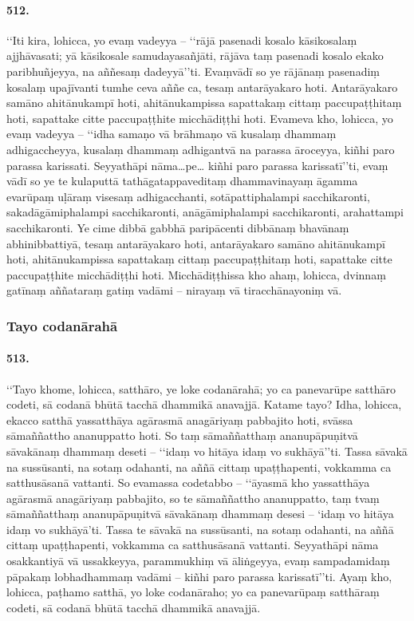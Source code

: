 \paragraph{512.} ‘‘Iti kira, lohicca, yo evaṃ vadeyya – ‘‘rājā pasenadi kosalo kāsikosalaṃ ajjhāvasati; yā kāsikosale samudayasañjāti, rājāva taṃ pasenadi kosalo ekako paribhuñjeyya, na aññesaṃ dadeyyā’’ti. Evaṃvādī so ye rājānaṃ pasenadiṃ kosalaṃ upajīvanti tumhe ceva aññe ca, tesaṃ antarāyakaro hoti. Antarāyakaro samāno ahitānukampī hoti, ahitānukampissa sapattakaṃ cittaṃ paccupaṭṭhitaṃ hoti, sapattake citte paccupaṭṭhite micchādiṭṭhi hoti. Evameva kho, lohicca, yo evaṃ vadeyya – ‘‘idha samaṇo vā brāhmaṇo vā kusalaṃ dhammaṃ adhigaccheyya, kusalaṃ dhammaṃ adhigantvā na parassa āroceyya, kiñhi paro parassa karissati. Seyyathāpi nāma…pe… kiñhi paro parassa karissatī’’ti, evaṃ vādī so ye te kulaputtā tathāgatappaveditaṃ dhammavinayaṃ āgamma evarūpaṃ uḷāraṃ visesaṃ adhigacchanti, sotāpattiphalampi sacchikaronti, sakadāgāmiphalampi sacchikaronti, anāgāmiphalampi sacchikaronti, arahattampi sacchikaronti. Ye cime dibbā gabbhā paripācenti dibbānaṃ bhavānaṃ abhinibbattiyā, tesaṃ antarāyakaro hoti, antarāyakaro samāno ahitānukampī hoti, ahitānukampissa sapattakaṃ cittaṃ paccupaṭṭhitaṃ hoti, sapattake citte paccupaṭṭhite micchādiṭṭhi hoti. Micchādiṭṭhissa kho ahaṃ, lohicca, dvinnaṃ gatīnaṃ aññataraṃ gatiṃ vadāmi – nirayaṃ vā tiracchānayoniṃ vā.

\subsubsection{Tayo codanārahā}

\paragraph{513.} ‘‘Tayo khome, lohicca, satthāro, ye loke codanārahā; yo ca panevarūpe satthāro codeti, sā codanā bhūtā tacchā dhammikā anavajjā. Katame tayo? Idha, lohicca, ekacco satthā yassatthāya agārasmā anagāriyaṃ pabbajito hoti, svāssa sāmaññattho ananuppatto hoti. So taṃ sāmaññatthaṃ ananupāpuṇitvā sāvakānaṃ dhammaṃ deseti – ‘‘idaṃ vo hitāya idaṃ vo sukhāyā’’ti. Tassa sāvakā na sussūsanti, na sotaṃ odahanti, na aññā cittaṃ upaṭṭhapenti, vokkamma ca satthusāsanā vattanti. So evamassa codetabbo – ‘‘āyasmā kho yassatthāya agārasmā anagāriyaṃ pabbajito, so te sāmaññattho ananuppatto, taṃ tvaṃ sāmaññatthaṃ ananupāpuṇitvā sāvakānaṃ dhammaṃ desesi – ‘idaṃ vo hitāya idaṃ vo sukhāyā’ti. Tassa te sāvakā na sussūsanti, na sotaṃ odahanti, na aññā cittaṃ upaṭṭhapenti, vokkamma ca satthusāsanā vattanti. Seyyathāpi nāma osakkantiyā vā ussakkeyya, parammukhiṃ vā āliṅgeyya, evaṃ sampadamidaṃ pāpakaṃ lobhadhammaṃ vadāmi – kiñhi paro parassa karissatī’’ti. Ayaṃ kho, lohicca, paṭhamo satthā, yo loke codanāraho; yo ca panevarūpaṃ satthāraṃ codeti, sā codanā bhūtā tacchā dhammikā anavajjā.

